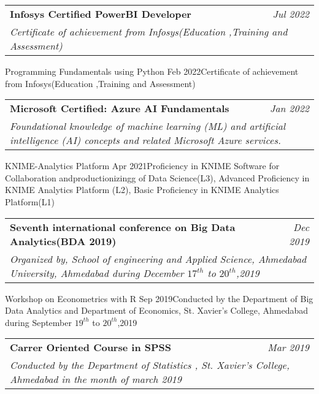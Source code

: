 \documentclass[letterpaper,11pt]{article}
\makeatletter
\newcommand{\resumeOrganizationHeading}[4]{
  \vspace{-2pt}\item
    \begin{tabular*}{0.97\textwidth}[t]{l@{\extracolsep{\fill}}r}
      \textbf{#1} & \textit{\small #2} \\
      \multicolumn{2}{p{0.97\textwidth}}{\raggedright\textit{\small #3}}\\[-5pt]

    \end{tabular*}\vspace{-7pt}
}
\newcommand{\resumeSubHeadingListEnd}{\end{itemize}}
\makeatother
\begin{document}
    \resumeOrganizationHeading
      {Infosys Certified PowerBI Developer \href{https://firebasestorage.googleapis.com/v0/b/documents-64531.appspot.com/o/PowerBI.pdf?alt=media}{\raisebox{-0.1\height}\faExternalLink }}{Jul 2022}{Certificate of achievement from Infosys(Education ,Training and Assessment)}

    \resumeOrganizationHeading
      {Programming Fundamentals using Python \href{https://www.linkedin.com/in/kashyap-gohil/details/certifications/}{\raisebox{-0.1\height}\faExternalLink }}{Feb 2022}{Certificate of achievement from Infosys(Education ,Training and Assessment)}

    \resumeOrganizationHeading
       {Microsoft Certified: Azure AI Fundamentals \href{https://www.credly.com/badges/95150e89-26aa-4e4c-897d-bcd3484ffcfa/public_url}{\raisebox{-0.1\height}\faExternalLink }}{Jan 2022}{Foundational knowledge of machine learning (ML) and artificial intelligence (AI) concepts and related Microsoft Azure services.} 
      
    \resumeOrganizationHeading
      {KNIME-Analytics Platform \href{https://firebasestorage.googleapis.com/v0/b/documents-64531.appspot.com/o/KNIME_L1_L2_L3.pdf?alt=media}{\raisebox{-0.1\height}\faExternalLink }}{Apr 2021}{Proficiency in KNIME Software for Collaboration andproductionizingg of Data Science(L3), Advanced Proficiency in KNIME Analytics Platform (L2), Basic Proficiency in KNIME Analytics Platform(L1)}
      
    \resumeOrganizationHeading
      {Seventh international conference on Big Data Analytics(BDA 2019) \href{https://firebasestorage.googleapis.com/v0/b/documents-64531.appspot.com/o/bda_conf.pdf?alt=media}{\raisebox{-0.1\height}\faExternalLink }}{Dec 2019}{Organized by, School of engineering and Applied Science, Ahmedabad University, Ahmedabad during December $17^{th}$ to $20^{th}$,2019}      

    \resumeOrganizationHeading
      {Workshop on Econometrics with R \href{https://firebasestorage.googleapis.com/v0/b/documents-64531.appspot.com/o/R.pdf?alt=media}{\raisebox{-0.1\height}\faExternalLink }}{Sep 2019}{Conducted by the Department of Big Data Analytics and Department of Economics, St. Xavier's College, Ahmedabad during September $19^{th}$ to $20^{th}$,2019}   
      
    \resumeOrganizationHeading
      {Carrer Oriented Course in SPSS \href{https://firebasestorage.googleapis.com/v0/b/documents-64531.appspot.com/o/spss_certificate.pdf?alt=media}{\raisebox{-0.1\height}\faExternalLink }}{Mar 2019}{Conducted by the Department of Statistics , St. Xavier's College, Ahmedabad in the month of march 2019}     
  \resumeSubHeadingListEnd
\end{document}
